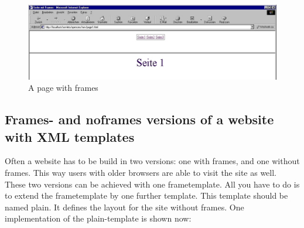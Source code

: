 \begin{figure}[hbt]
\begin{center}
\includegraphics[width=\sgw]
                   {pics/templateMech/frames_kurz}
\caption[A page with frames]
           {A page with frames}
\label{frames1}
\end{center}
\end{figure}

\subsection{Frames- and noframes versions of a website with XML templates}

Often a website has to be build in two versions: one with frames,
and one without frames. This way users with older browsers are
able to visit the site as well. These two versions can be achieved
with one frametemplate. All you have to do is to extend
the frametemplate by one further template. This template should
be named {\name plain}. It defines the layout for the site without
frames. One implementation of the {\name plain}-template is shown now:


